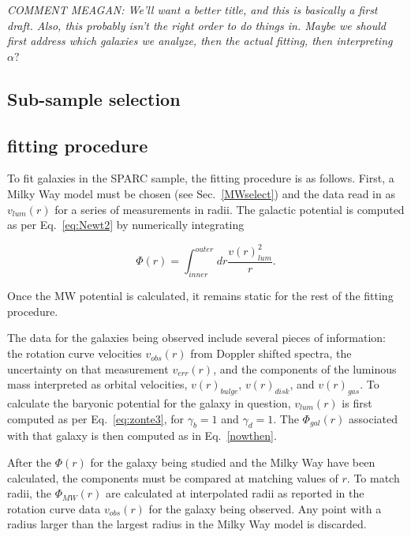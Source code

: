 \documentclass[reprint,%
 amsmath,amssymb,
 aps,
]{revtex4-1}
\begin{document}
 

 
 
 


{\color{blue}\emph{COMMENT MEAGAN: We'll want a better title, and this is basically a first draft.  Also, this probably isn't the right order to do things in. Maybe we should first address which galaxies we analyze, then the actual fitting, then interpreting $\alpha?$} }
\subsection{Sub-sample selection}

\subsection{fitting procedure}



To fit galaxies in the SPARC sample,  the fitting procedure is as follows.   First,  a       Milky Way model must be chosen (see Sec.~\ref{MWselect})  and the data  read in as $v_{lum}(r)$ for a series of measurements in radii. The galactic potential is computed as per Eq.~\ref{eq:Newt2} by numerically integrating

\begin{equation}
\Phi(r) = \int_{inner}^{outer} dr \frac{ 
v(r)^2_{lum} 
}{r}.
\label{nowthen}
\end{equation}

Once the MW potential is calculated, it remains static for the rest of the fitting procedure.  

The data for the   galaxies being observed include several pieces of information: the rotation curve velocities $v_{obs}(r)$ from Doppler shifted spectra, the uncertainty on that measurement $v_{err}(r)$, and the components of the luminous mass interpreted as orbital velocities,  $v(r)_{bulge}$, $v(r)_{disk}$, and $v(r)_{gas}$. 
To calculate the baryonic potential for the galaxy in question, $v_{lum}(r)$ is first computed   as per Eq.~\ref{eq:zonte3}, for $\gamma_b=1$ and $\gamma_d=1$. The $\Phi_{gal}(r)$ associated with that galaxy   is then computed as in Eq.~\ref{nowthen}.

After the $\Phi(r)$ for the galaxy being studied and the Milky Way have been calculated,   the components must be compared at  matching values of $r$. To match radii, the $\Phi_{MW}(r)$ are calculated at  interpolated   radii as reported in the 
rotation curve data $v_{obs}(r)$ for the galaxy being observed. Any point with a radius larger than the largest radius in the Milky Way model is discarded.
\end{document}
